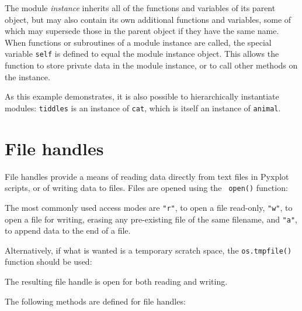The module {\it instance} inherits all of the functions and variables of its
parent object, but may also contain its own additional functions and variables,
some of which may supersede those in the parent object if they have the same
name. When functions or subroutines of a module instance are called, the
special variable {\tt self} is defined to equal the module instance object.
This allows the function to store private data in the module instance, or to
call other methods on the instance.

\vspace{3mm}

\vspace{3mm}

As this example demonstrates, it is also possible to hierarchically instantiate
modules: {\tt tiddles} is an instance of {\tt cat}, which is itself an instance
of {\tt animal}.

\section{File handles}

File handles provide a means of reading data directly from text files in
Pyxplot scripts, or of writing data to files. Files are opened using the {\tt
open()} function:

\vspace{2mm}
\vspace{4mm}

\noindent The most commonly used access modes are {\tt "r"}, to open a file read-only, {\tt "w"}, to open a file for writing, erasing any pre-existing file of the same filename, and {\tt "a"}, to append data to the end of a file.

Alternatively, if what is wanted is a temporary scratch space, the {\tt os.tmpfile()} function should be used:

\vspace{2mm}
\vspace{4mm}

\noindent The resulting file handle is open for both reading and writing.

The following methods are defined for file handles:


